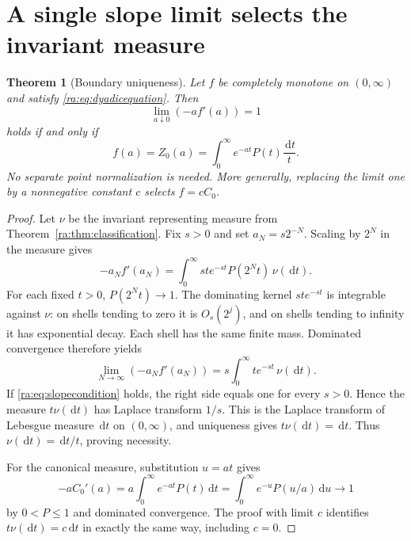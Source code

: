 \documentclass[11pt,a4paper,oneside,openany]{book}
\numberwithin{equation}{chapter}
\newtheorem{theorem}{Theorem}[chapter]
\theoremstyle{definition}
\theoremstyle{remark}
\newcommand{\dd}{\,\mathrm d}
\begin{document}
\section{A single slope limit selects the invariant measure}
\begin{theorem}[Boundary uniqueness]\label{ra:thm:uniqueness}
Let $f$ be completely monotone on $(0,\infty)$ and satisfy
\eqref{ra:eq:dyadicequation}. Then
\begin{equation}\label{ra:eq:slopecondition}
 \lim_{a\downarrow0}(-a f'(a))=1
\end{equation}
holds if and only if
\begin{equation}\label{ra:eq:canonicalunique}
 f(a)=Z_0(a)=\int_0^\infty e^{-at}P(t)\frac{\dd t}{t}.
\end{equation}
No separate point normalization is needed.
More generally, replacing the limit one by a nonnegative constant $c$
selects $f=cC_0$.
\end{theorem}
\begin{proof}
Let $\nu$ be the invariant representing measure from
Theorem~\ref{ra:thm:classification}. Fix $s>0$ and set $a_N=s2^{-N}$.
Scaling by $2^N$ in the measure gives
\begin{equation}\label{ra:eq:slopescale}
 -a_N f'(a_N)
 =\int_0^\infty st e^{-st}P(2^Nt)\,\nu(\dd t).
\end{equation}
For each fixed $t>0$, $P(2^Nt)\to1$.
The dominating kernel $st e^{-st}$ is integrable against $\nu$:
on shells tending to zero it is $O_s(2^j)$, and on shells tending to
infinity it has exponential decay. Each shell has the same finite mass.
Dominated convergence therefore yields
\begin{equation}\label{ra:eq:slopelimit}
 \lim_{N\to\infty}(-a_N f'(a_N))
   =s\int_0^\infty t e^{-st}\,\nu(\dd t).
\end{equation}
If \eqref{ra:eq:slopecondition} holds, the right side equals one for every
$s>0$. Hence the measure $t\nu(\dd t)$ has Laplace transform $1/s$.
This is the Laplace transform of Lebesgue measure $\dd t$ on
$(0,\infty)$, and uniqueness gives $t\nu(\dd t)=\dd t$.
Thus $\nu(\dd t)=\dd t/t$, proving necessity.

For the canonical measure, substitution $u=at$ gives
\[
 -aC_0'(a)=a\int_0^\infty e^{-at}P(t)\dd t
       =\int_0^\infty e^{-u}P(u/a)\dd u\longrightarrow1
\]
by $0<P\le1$ and dominated convergence.
The proof with limit $c$ identifies $t\nu(\dd t)=c\dd t$ in exactly the
same way, including $c=0$.
\end{proof}
\end{document}
